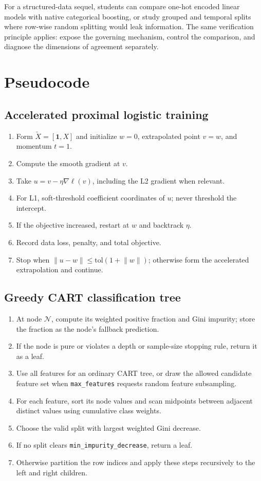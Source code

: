\documentclass[11pt]{article}
\newcommand{\code}[1]{\texttt{#1}}
\begin{document}
For a structured-data sequel, students can compare one-hot encoded linear
models with native categorical boosting, or study grouped and temporal splits
where row-wise random splitting would leak information. The same verification
principle applies: expose the governing mechanism, control the comparison, and
diagnose the dimensions of agreement separately.

\appendix
\section{Pseudocode}

\subsection{Accelerated proximal logistic training}

\begin{enumerate}
\item Form $\tilde X=[\mathbf{1},X]$ and initialize $w=0$, extrapolated point
$v=w$, and momentum $t=1$.
\item Compute the smooth gradient at $v$.
\item Take $u=v-\eta\nabla\ell(v)$, including the L2 gradient when relevant.
\item For L1, soft-threshold coefficient coordinates of $u$; never threshold
the intercept.
\item If the objective increased, restart at $w$ and backtrack $\eta$.
\item Record data loss, penalty, and total objective.
\item Stop when $\lVert u-w\rVert\le\text{tol}(1+\lVert w\rVert)$; otherwise
form the accelerated extrapolation and continue.
\end{enumerate}

\subsection{Greedy CART classification tree}

\begin{enumerate}
\item At node $\mathcal N$, compute its weighted positive fraction and Gini
impurity; store the fraction as the node's fallback prediction.
\item If the node is pure or violates a depth or sample-size stopping rule,
return it as a leaf.
\item Use all features for an ordinary CART tree, or draw the allowed candidate
feature set when \code{max\_features} requests random feature subsampling.
\item For each feature, sort its node values and scan midpoints between adjacent
distinct values using cumulative class weights.
\item Choose the valid split with largest weighted Gini decrease.
\item If no split clears \code{min\_impurity\_decrease}, return a leaf.
\item Otherwise partition the row indices and apply these steps recursively to
the left and right children.
\end{enumerate}
\end{document}
